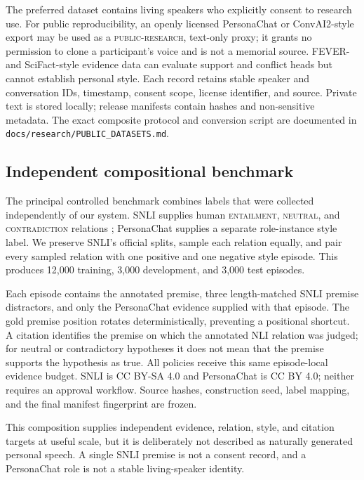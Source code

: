 \documentclass[11pt,a4paper]{article}
\begin{document}
The preferred dataset contains living speakers who explicitly consent to
  research use.  For public reproducibility, an openly licensed PersonaChat or
  ConvAI2-style export \citep{zhang2018personalizing} may be used as a
  \textsc{public-research}, text-only proxy;
it grants no permission to clone a participant's voice and is not a memorial
  source.  FEVER- and SciFact-style evidence data
  \citep{thorne2018fever,wadden2020fact} can evaluate support and conflict heads
  but cannot establish personal style.  Each record retains stable
speaker and conversation IDs, timestamp, consent scope, license identifier, and
source.  Private text is stored locally; release manifests contain hashes and
non-sensitive metadata.  The exact composite protocol and conversion script
are documented in \texttt{docs/research/PUBLIC\_DATASETS.md}.

\subsection{Independent compositional benchmark}

The principal controlled benchmark combines labels that were collected
independently of our system.  SNLI supplies human
\textsc{entailment}, \textsc{neutral}, and \textsc{contradiction} relations
\citep{bowman2015snli}; PersonaChat supplies a separate role-instance style
label.  We preserve SNLI's official splits, sample each relation equally, and
pair every sampled relation with one positive and one negative style episode.
This produces 12,000 training, 3,000 development, and 3,000 test episodes.

Each episode contains the annotated premise, three length-matched SNLI premise
distractors, and only the PersonaChat evidence supplied with that episode.
The gold premise position rotates deterministically, preventing a positional
shortcut.  A citation identifies the premise on which the annotated NLI
relation was judged; for neutral or contradictory hypotheses it does not mean
that the premise supports the hypothesis as true.  All policies receive this
same episode-local evidence budget.  SNLI is CC BY-SA 4.0 and PersonaChat is CC
BY 4.0; neither requires an approval workflow.  Source hashes, construction
seed, label mapping, and the final manifest fingerprint are frozen.

This composition supplies independent evidence, relation, style, and citation
targets at useful scale, but it is deliberately not described as naturally
generated personal speech.  A single SNLI premise is not a consent record, and
a PersonaChat role is not a stable living-speaker identity.
\end{document}
